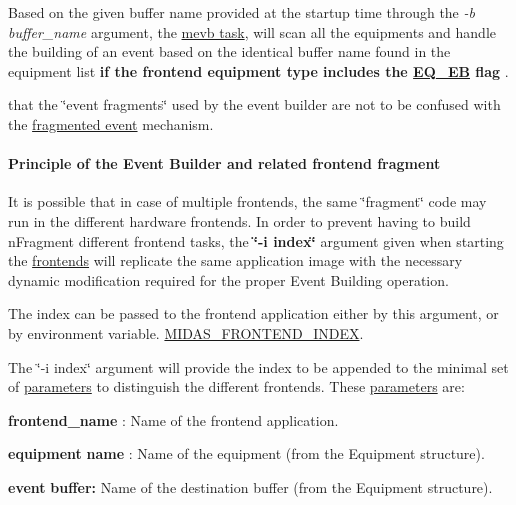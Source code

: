 Based on the given buffer name provided at the startup time through the {\itshape  -\/b buffer\_\-name \/} argument, the \hyperlink{FE_Event_Builder_FE_mevb_utility}{mevb task}, will scan all the equipments and handle the building of an event based on the identical buffer name found in the equipment list {\bfseries  if the frontend equipment type includes the \hyperlink{FE_table_FE_tbl_EqEb}{EQ\_\-EB} flag }.

that the \char`\"{}event fragments\char`\"{} used by the event builder are not to be confused with the \hyperlink{FE_eq_event_routines_FE_fragmented_event}{fragmented event} mechanism.

\label{FE_Event_Builder_idx_event_fragment}
\hypertarget{FE_Event_Builder_idx_event_fragment}{}
 \hypertarget{FE_Event_Builder_FE_principle_eb}{}\paragraph{Principle of the Event Builder and related frontend fragment}\label{FE_Event_Builder_FE_principle_eb}
It is possible that in case of multiple frontends, the same \char`\"{}fragment\char`\"{} code may run in the different hardware frontends. In order to prevent having to build nFragment different frontend tasks, the {\bfseries  \char`\"{}-\/i index\char`\"{} } argument given when starting the \hyperlink{FrontendOperation_FE_frontend_utility}{frontends} will replicate the same application image with the necessary dynamic modification required for the proper Event Building operation.

The index can be passed to the frontend application either by this argument, or by environment variable. \hyperlink{BuildingOptions_BO_MIDAS_FRONTEND_INDEX}{MIDAS\_\-FRONTEND\_\-INDEX}.

The \char`\"{}-\/i index\char`\"{} argument will provide the index to be appended to the minimal set of \hyperlink{structparameters}{parameters} to distinguish the different frontends. These \hyperlink{structparameters}{parameters} are:
\begin{DoxyItemize}
\item {\bfseries frontend\_\-name} : Name of the frontend application.
\item {\bfseries equipment} {\bfseries name} : Name of the equipment (from the Equipment structure).
\item {\bfseries event} {\bfseries buffer:} Name of the destination buffer (from the Equipment structure).
\end{DoxyItemize}

